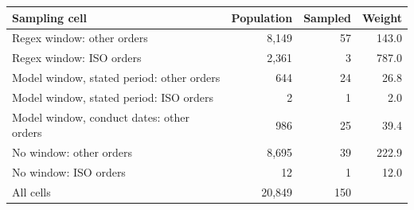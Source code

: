 \begin{tabular*}{\textwidth}[]{l@{\extracolsep\fill}rrr}
\toprule
Sampling cell & Population & Sampled & Weight\\
\midrule
Regex window: other orders & 8,149 & 57 & 143.0\\
Regex window: ISO orders & 2,361 & 3 & 787.0\\
Model window, stated period: other orders & 644 & 24 & 26.8\\
Model window, stated period: ISO orders & 2 & 1 & 2.0\\
Model window, conduct dates: other orders & 986 & 25 & 39.4\\
No window: other orders & 8,695 & 39 & 222.9\\
No window: ISO orders & 12 & 1 & 12.0\\
All cells & 20,849 & 150 & \\
\bottomrule
\end{tabular*}
